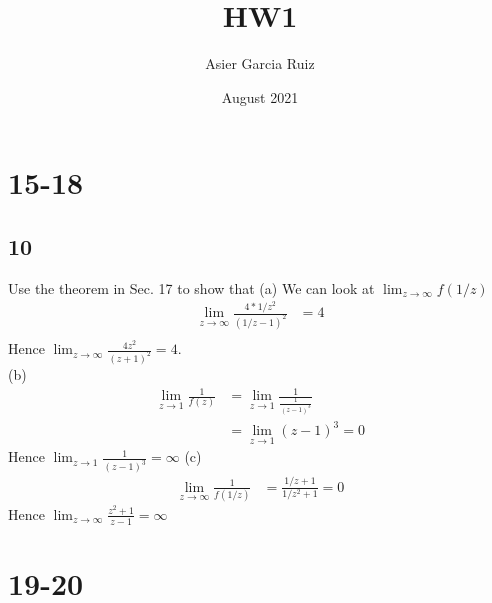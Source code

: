 \documentclass{article}
\title{HW1}
\author{Asier Garcia Ruiz }
\date{August 2021}
\newcommand{\ra}{\xrightarrow{}}
\begin{document}
    \maketitle
    \section*{15-18}
    \subsection*{10}
    Use the theorem in Sec. 17 to show that
    (a) We can look at $\lim_{z \ra \infty}f(1/z)$
    \begin{align*}
        \lim_{z\ra\infty} \frac{4*1/z^2}{(1/z - 1)^2} &= 4 \\
    \end{align*}
    Hence $\lim_{z\ra\infty}\frac{4z^2}{(z+1)^2} = 4$. \\
    (b) \begin{align*}
        \lim_{z\ra 1} \frac{1}{f(z)} &= \lim_{z\ra 1} \frac{1}{\frac{1}{(z-1)^3}} \\
            &= \lim_{z\ra 1} (z-1)^3 = 0
    \end{align*}
    Hence $\lim_{z\ra 1} \frac{1}{(z-1)^3} = \infty$
    (c) \begin{align*}
        \lim_{z\ra\infty} \frac{1}{f(1/z)} &= \frac{1/z + 1}{1/z^2 + 1} = 0
    \end{align*}
    Hence $\lim_{z\ra\infty}\frac{z^2 + 1}{z - 1} = \infty$
    \section*{19-20}
\end{document}

